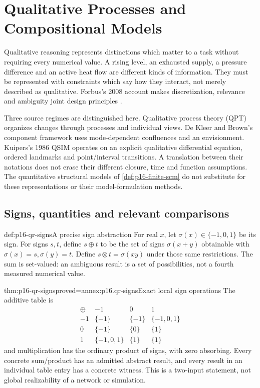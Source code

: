 \chapter{Qualitative Processes and Compositional Models}
\label{sec:p16-qualitative-process-and-model-reasoning}

Qualitative reasoning represents distinctions which matter to a task without
requiring every numerical value. A rising level, an exhausted supply, a
pressure difference and an active heat flow are different kinds of information.
They must be represented with constraints which say how they interact, not
merely described as qualitative. Forbus's 2008 account makes discretization,
relevance and ambiguity joint design principles
\cite[secs.~9.1--9.6]{Forbus2008QualitativeModeling}.

Three source regimes are distinguished here. Qualitative process theory (QPT)
organizes changes through processes and individual views. De Kleer and Brown's
component framework uses mode-dependent confluences and an envisionment.
Kuipers's 1986 QSIM operates on an explicit qualitative differential equation,
ordered landmarks and point/interval transitions. A translation between their
notations does not erase their different closure, time and function assumptions.
The quantitative structural models of \cref{def:p16-finite-scm} do not
substitute for these representations or their model-formulation methods.

\section{Signs, quantities and relevant comparisons}
\label{sec:p16-qr-quantities}

\begin{hbdefinition}{def:p16-qr-signs}{A precise sign abstraction}
For real \(x\), let \(\sigma(x)\in\{-1,0,1\}\) be its sign.
For signs \(s,t\), define \(s\oplus t\) to be the set of signs
\(\sigma(x+y)\) obtainable with \(\sigma(x)=s,\sigma(y)=t\).
Define \(s\otimes t=\sigma(xy)\) under those same restrictions.
The sum is set-valued: an ambiguous result is a set of possibilities,
not a fourth measured numerical value.
\end{hbdefinition}

\begin{hbtheorem}{thm:p16-qr-signs}{proved=annex:p16.qr-signs}{Exact local sign operations}
The additive table is
\[
\begin{array}{c|ccc}
 \oplus&-1&0&1\\\hline
 -1&\{-1\}&\{-1\}&\{-1,0,1\}\\
 0&\{-1\}&\{0\}&\{1\}\\
 1&\{-1,0,1\}&\{1\}&\{1\}
\end{array}
\]
and multiplication has the ordinary product of signs, with zero absorbing.
Every concrete sum/product has an admitted abstract result, and every result
in an individual table entry has a concrete witness. This is a two-input
statement, not global realizability of a network or simulation.
\end{hbtheorem}

